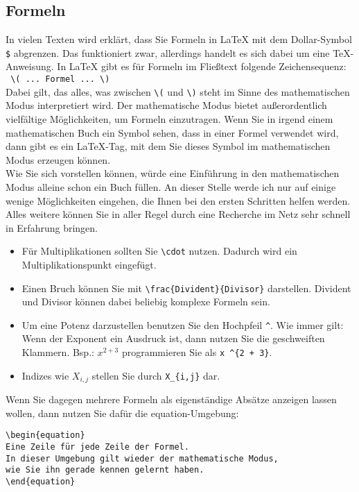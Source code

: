 \subsection{Formeln}

In vielen Texten wird erklärt, dass Sie Formeln in LaTeX mit dem Dollar-Symbol \verb|$| abgrenzen. Das funktioniert zwar, allerdings handelt es sich dabei um eine TeX-Anweisung. In LaTeX gibt es für Formeln im Fließtext folgende Zeichensequenz:\\

\verb| \( ... Formel ... \)|\\

Dabei gilt, das alles, was zwischen \verb|\(| und \verb|\)| steht im Sinne des mathematischen Modus interpretiert wird. Der mathematische Modus bietet außerordentlich vielfältige Möglichkeiten, um Formeln einzutragen. Wenn Sie in irgend einem mathematischen Buch ein Symbol sehen, dass in einer Formel verwendet wird, dann gibt es ein LaTeX-Tag, mit dem Sie dieses Symbol im mathematischen Modus erzeugen können.\\

Wie Sie sich vorstellen können, würde eine Einführung in den mathematischen Modus alleine schon ein Buch füllen. An dieser Stelle werde ich nur auf einige wenige Möglichkeiten eingehen, die Ihnen bei den ersten Schritten helfen werden. Alles weitere können Sie in aller Regel durch eine Recherche im Netz sehr schnell in Erfahrung bringen.

\begin{itemize}
	\item Für Multiplikationen sollten Sie \verb|\cdot| nutzen. Dadurch wird ein Multiplikationspunkt eingefügt.
	\item Einen Bruch können Sie mit \verb|\frac{Divident}{Divisor}| darstellen. Divident und Divisor können dabei beliebig komplexe Formeln sein.
	\item Um eine Potenz darzustellen benutzen Sie den Hochpfeil \verb|^|. Wie immer gilt: Wenn der Exponent ein Ausdruck ist, dann nutzen Sie die geschweiften Klammern. Bsp.: \(x^{2 + 3}\) programmieren Sie als \verb|x ^{2 + 3}|.
	\item Indizes wie \(X_{i,j}\) stellen Sie durch \verb|X_{i,j}| dar.
\end{itemize}

Wenn Sie dagegen mehrere Formeln als eigenständige Absätze anzeigen lassen wollen, dann nutzen Sie dafür die equation-Umgebung:

\begin{verbatim}
\begin{equation}
Eine Zeile für jede Zeile der Formel.
In dieser Umgebung gilt wieder der mathematische Modus, 
wie Sie ihn gerade kennen gelernt haben.
\end{equation}
\end{verbatim}

